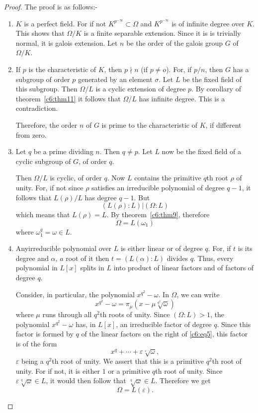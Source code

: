 \begin{proof} %
The proof is as follows:-
\begin{enumerate}[1)]
\item $K$ is a perfect field. For if not $K^{p^{- \infty}} \subset
  \Omega$ and $K^{p^{- \infty}}$ is of infinite degree over $K$. This
  shows that $\Omega / K$ is a finite separable extension. Since it is
  is trivially normal, it is galois extension. Let $n$ be the order of
  the galois group $G$ of $\Omega / K$. 

\item If $p$ is the characteristic of $K$, then $p\nmid n$ (if $p \neq
  o$). 
For, if $p/n$, then $G$ has a subgroup of order $p$ generated by an
element $\sigma$. Let $L$ be the fixed field of this subgroup. Then
$\Omega / L$ is a cyclic extension of degree $p$. By corollary of
theorem~\ref{c6:thm11} it follows that $\Omega / L$ has infinite
degree. This is a contradiction.  

Therefore, the order $n$ of $G$ is prime to the characteristic of $K$,
if different from zero. 

\item Let $q$ be a prime dividing $n$. Then $q \neq p$. Let $L$ now be
  the fixed field of a cyclic subgroup of $G$, of order $q$. 

Then $\Omega / L$ is cyclic, of order $q$. Now $L$ contains the
primitive $q$th root $\rho$ of unity. For, if not since $\rho$ satisfies an
irreducible polynomial of degree $q-1$, it follows that $L(\rho)/L$
has degree $q-1$. But  
$$
(L(\rho):L)|(\Omega : L)
$$
which means that $L(\rho)=L$. By theorem~\ref{c6:thm9}, therefore 
$$
\Omega= L(\omega_1)
$$
where $\omega^q_1 = \omega \in L$.

\item Any\pageoriginale irreducible polynomial over $L$ is either
  linear or of degree $q$. For, if $t$ is its degree and $\alpha$, $a$
  root of it then $t=(L(\alpha) : L)$ divides $q$. Thus, every
  polynomial in $L[x]$ splits in $L$ into product of linear factors
  and of factors of degree $q$. 

Consider, in particular, the polynomial $x^{q^2} - \omega$. In $\Omega$,
we can write  
\begin{equation*}
x^{q^2}-\omega = \pi_{\mu} (x - \mu \sqrt[q^2]{\omega}) \tag{5}\label{c6:eq5}
\end{equation*}
where $\mu$ runs through all $q^2$th roots of unity. Since
$(\Omega:L)>1$, the polynomial $x^{q^2}-\omega$ has, in $L[x]$, an
irreducible factor of degree $q$. Since this factor is formed by $q$ of
the linear factors on the right of \eqref{c6:eq5}, this factor is of the form   
$$
x^q + \cdots + \varepsilon \sqrt[\varepsilon]{\omega}, 
$$
$\varepsilon$ being a $q^2$th root of unity. We assert that this is a
primitive $q^2$th root of unity. For if not, it is either $1$ or a
primitive $q$th root of unity. Since $\varepsilon \sqrt[q]{\omega} \in L$,
it would then follow that $\sqrt[q]{\omega} \in
L$. Therefore we get  
$$
\Omega= L(\varepsilon).
$$


\end{enumerate}
\end{proof}
